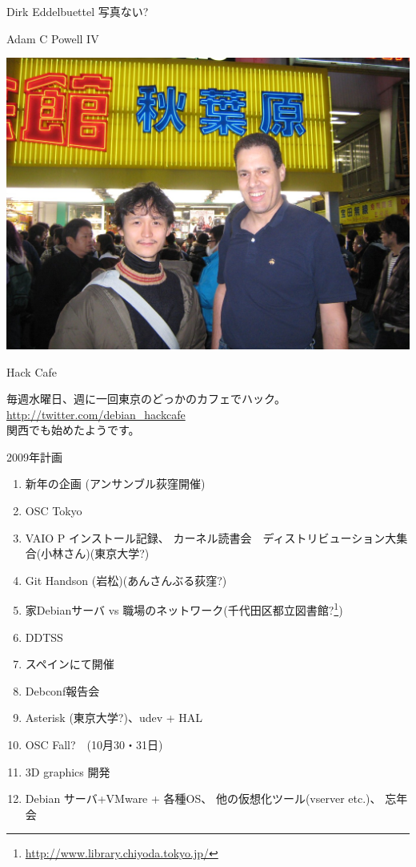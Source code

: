\begin{frame}{Dirk Eddelbuettel}
 写真ない? 
\end{frame}

\begin{frame}{Adam C Powell IV}

 \includegraphics[width=1\hsize]{image200912/acp.jpg}

\end{frame}

\begin{frame}{Hack Cafe}

毎週水曜日、週に一回東京のどっかのカフェでハック。\\
\url{http://twitter.com/debian_hackcafe}\\
関西でも始めたようです。
\end{frame}

\begin{frame}{2009年計画}

{\scriptsize
 \begin{enumerate}
  \item 新年の企画 (アンサンブル荻窪開催)
  \item OSC Tokyo
  \item VAIO P インストール記録、
	カーネル読書会　ディストリビューション大集合(小林さん)(東京大学?)
  \item Git Handson (岩松)(あんさんぶる荻窪?)
  \item 家Debianサーバ vs 職場のネットワーク(千代田区都立図書館?\footnote{\url{http://www.library.chiyoda.tokyo.jp/}})
  \item DDTSS 
  \item スペインにて開催
  \item Debconf報告会
  \item Asterisk (東京大学?)、udev + HAL
  \item OSC Fall?　(10月30・31日)
  \item 3D graphics 開発 
  \item Debian サーバ+VMware + 各種OS、
	他の仮想化ツール(vserver etc.)、
	忘年会
 \end{enumerate}
}
\end{frame}

